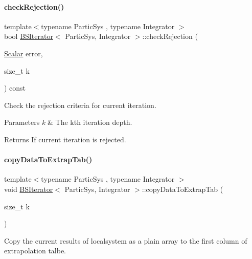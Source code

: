 \paragraph{\texorpdfstring{check\+Rejection()}{checkRejection()}}
{\footnotesize\ttfamily template$<$typename Partic\+Sys , typename Integrator $>$ \\
bool \mbox{\hyperlink{class_b_s_iterator}{B\+S\+Iterator}}$<$ Partic\+Sys, Integrator $>$\+::check\+Rejection (\begin{DoxyParamCaption}\item[{\mbox{\hyperlink{class_b_s_iterator_a7857f8ff9032955ea4dcc22cd18ca7a1}{Scalar}}}]{error,  }\item[{size\+\_\+t}]{k }\end{DoxyParamCaption}) const\hspace{0.3cm}{\ttfamily [private]}}



Check the rejection criteria for current iteration. 


\begin{DoxyParams}{Parameters}
{\em k} & The kth iteration depth. \\
\hline
\end{DoxyParams}
\begin{DoxyReturn}{Returns}
If current iteration is rejected. 
\end{DoxyReturn}
\mbox{\label{class_b_s_iterator_a95c268219a8321af35a628db4e22bec4}} 
\paragraph{\texorpdfstring{copy\+Data\+To\+Extrap\+Tab()}{copyDataToExtrapTab()}}
{\footnotesize\ttfamily template$<$typename Partic\+Sys , typename Integrator $>$ \\
void \mbox{\hyperlink{class_b_s_iterator}{B\+S\+Iterator}}$<$ Partic\+Sys, Integrator $>$\+::copy\+Data\+To\+Extrap\+Tab (\begin{DoxyParamCaption}\item[{size\+\_\+t}]{k }\end{DoxyParamCaption})\hspace{0.3cm}{\ttfamily [private]}}



Copy the current results of localsystem as a plain array to the first column of extrapolation talbe. 


